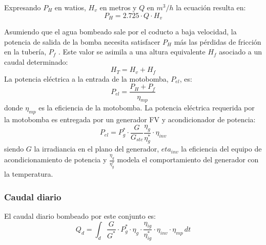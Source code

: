 Expresando \(P_H\) en watios, \(H_v\) en metros y \(Q\) en \(m^3/h\) la ecuación resulta en:
\begin{equation}
P_H=2.725\cdot Q \cdot H_v
\end{equation}

Asumiendo que el agua bombeado sale por el coducto a baja velocidad, la potencia de salida de la bomba necesita satisfacer \(P_H\)  más las pérdidas de fricción en la tubería, \(P_f\) . Este valor se asimila a una altura equivalente \(H_f\)  asociado a un caudal determinado: 
\begin{equation}
H_T=H_v+H_f
\end{equation}
La potencia eléctrica a la entrada de la motobomba, \(P_{el}\), es:
\begin{equation}
P_{el}=\frac{P_H+P_f}{\eta_{mp}} 
\end{equation}
donde \(\eta_{mp}\) es la eficiencia de la motobomba.
La potencia eléctrica requerida por la motobomba es entregada por un generador FV y acondicionador de potencia:
\begin{equation}
P_{el}=P_g^* \cdot \frac{G}{G_{stc}} \frac{\eta_g}{\eta_g^*} \cdot \eta_{inv}
\end{equation}
siendo \(G\) la irradiancia en el plano del generador, \(eta_{inv}\) la eficiencia del equipo de acondicionamiento de potencia y \(\frac{\eta_g}{\eta_g^*}\) modela el comportamiento del generador con la temperatura.

\subsubsection{Caudal diario}
\label{sec:orgb89ded7}
El caudal diario bombeado por este conjunto es:
\begin{equation}
Q_d = \int_{d} \frac{G}{G^*} \cdot P_g^* \cdot \eta_g \cdot \frac{\eta_{ig}}{\eta_{ig}^*} \cdot \eta_{inv} \cdot \eta_{mp} \, dt
\end{equation}

